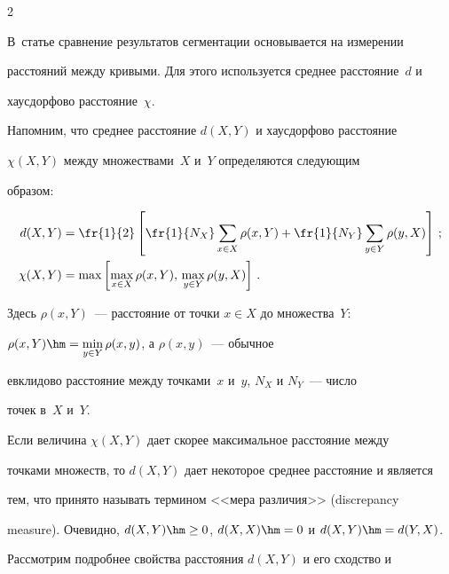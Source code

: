 \begin{multicols}{2}
\begin{itemize}
\end{itemize}





  В~статье сравнение результатов сегментации основывается на измерении 


расстояний между кривыми. Для этого используется среднее расстояние~$d$ и 


хаусдорфово расстояние~$\chi$.


  


  Напомним, что среднее расстояние $d(X, Y)$ и хаусдорфово расстояние 


$\chi(X, Y)$ между множествами~$X$ и~$Y$ определяются следующим 


образом:


  \begin{align*}


  d(X,Y) &=\fr{1}{2}\left[ 


\fr{1}{N_X}\sum\limits_{x\in X}\rho(x,Y)+\fr{1}{N_Y}\sum\limits_{y\in 


Y}\rho(y,X)\right]\,;\\


  \chi(X,Y) &= \max\left[\max\limits_{x\in X} 


\rho(x,Y),\,\max\limits_{y\in Y}\rho(y,X)\right]\,.


  \end{align*}


    Здесь $\rho(x, Y)$~--- расстояние от точки $x\in X$ до множества~$Y$: 


$\rho(x,Y)\hm=\min\limits_{y\in Y}\rho(x,y)$, а $\rho(x,y)$~--- обычное 


  евклидово расстояние между точками~$x$ и~$y$, $N_X$ и $N_Y$~--- чис\-ло 


точек в~$X$ и~$Y$.


  


  Если величина $\chi(X, Y)$ дает скорее максимальное расстояние между 


точками множеств, то $d(X, Y)$ дает некоторое среднее расстояние и является 


тем, что принято называть термином <<мера различия>> (discrepancy 


measure). Очевидно, $d(X, Y) \hm\geq 0$, $d(X, X) \hm=0$ и $d(X, Y) \hm= d(Y, 


X)$.


  


  Рассмотрим подробнее свойства расстояния $d(X, Y)$ и его сходство и 



\end{multicols}
